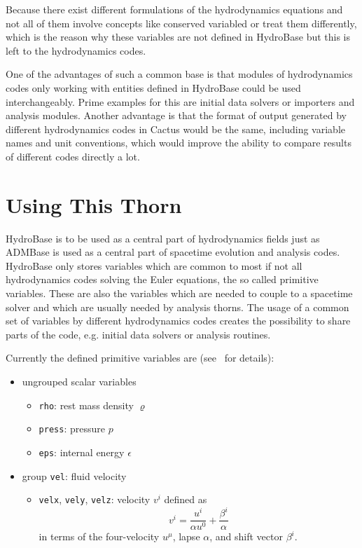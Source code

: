Because there exist different formulations of the hydrodynamics equations and not all of
them involve concepts like conserved variabled or treat them
differently, which is the reason why these variables are not defined in HydroBase but this
is left to the hydrodynamics codes.

One of the advantages of such a common base is that modules of hydrodynamics codes only
working with entities defined in HydroBase could be used interchangeably. Prime examples
for this are initial data solvers or importers and analysis modules.
Another advantage is that the format of output generated by different hydrodynamics
codes in Cactus would be the same, including variable names and unit conventions, which
would improve the ability to compare results of different codes directly a lot.

\section{Using This Thorn}

HydroBase is to be used as a central part of hydrodynamics fields just as ADMBase is used as a 
central part of spacetime evolution and analysis codes. HydroBase only stores variables which
are common to most if not all hydrodynamics codes solving the Euler
equations, the so called primitive variables. These are also the variables which are needed
to couple to a spacetime solver and which are usually needed by analysis thorns. The usage of
a common set of variables by different hydrodynamics codes creates the possibility to share
parts of the code, e.g. initial data solvers or analysis routines. 

Currently the defined primitive variables are (see~\cite{livrevgrfd} for
details):
\begin{itemize}
 \item ungrouped scalar variables
 \begin{itemize}
  \item \verb|rho|: rest mass density $\varrho$
  \item \verb|press|: pressure $p$
  \item \verb|eps|: internal energy $\epsilon$
 \end{itemize}
 \item group \verb|vel|: fluid velocity
 \begin{itemize}
  \item \verb|velx|, \verb|vely|, \verb|velz|: velocity $v^i$ defined as
      \begin{equation}
	  v^i = \frac{u^i}{\alpha u^0} + \frac{\beta^i}{\alpha}
      \end{equation}
      in terms of the four-velocity $u^\mu$, lapse $\alpha$, and shift vector
      $\beta^i$.
 \end{itemize}
\end{itemize}

